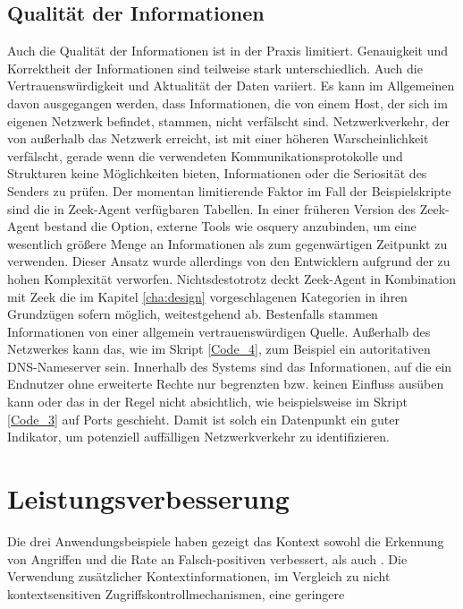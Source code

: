 \subsection{Qualität der Informationen}
Auch die Qualität der Informationen ist in der Praxis limitiert. Genauigkeit und Korrektheit der Informationen sind teilweise stark unterschiedlich. Auch die Vertrauenswürdigkeit und Aktualität der Daten variiert. Es kann im Allgemeinen davon ausgegangen werden, dass Informationen, die von einem Host, der sich im eigenen Netzwerk befindet, stammen, nicht verfälscht sind. Netzwerkverkehr, der von außerhalb das Netzwerk erreicht, ist mit einer höheren Warscheinlichkeit verfälscht, gerade wenn die verwendeten Kommunikationsprotokolle und Strukturen keine Möglichkeiten bieten, Informationen oder die Seriosität des Senders zu prüfen.
Der momentan limitierende Faktor im Fall der Beispielskripte sind die in Zeek-Agent verfügbaren Tabellen. In einer früheren Version des Zeek-Agent bestand die Option, externe Tools wie osquery anzubinden, um eine wesentlich größere Menge an Informationen als zum gegenwärtigen Zeitpunkt zu verwenden. Dieser Ansatz wurde allerdings von den Entwicklern aufgrund der zu hohen Komplexität verworfen. Nichtsdestotrotz deckt Zeek-Agent in Kombination mit Zeek die im Kapitel \ref{cha:design} vorgeschlagenen Kategorien in ihren Grundzügen sofern möglich, weitestgehend ab.
Bestenfalls stammen Informationen von einer allgemein vertrauenswürdigen Quelle. Außerhalb des Netzwerkes kann das, wie im Skript \ref{Code_4}, zum Beispiel ein autoritativen DNS-Nameserver sein. Innerhalb des Systems sind das Informationen, auf die ein Endnutzer ohne erweiterte Rechte nur begrenzten bzw. keinen Einfluss ausüben kann oder das in der Regel nicht absichtlich, wie beispielsweise im Skript \ref{Code_3} auf Ports geschieht. Damit ist solch ein Datenpunkt ein guter Indikator, um potenziell auffälligen Netzwerkverkehr zu identifizieren.
\section{Leistungsverbesserung}
Die drei Anwendungsbeispiele haben gezeigt das Kontext sowohl die Erkennung von Angriffen und die Rate an Falsch-positiven verbessert, als auch . Die Verwendung zusätzlicher Kontextinformationen, im Vergleich zu nicht kontextsensitiven Zugriffskontrollmechanismen, eine geringere 
